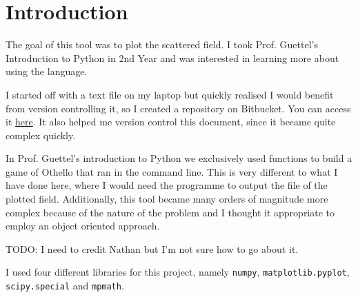 %
\section{Introduction}
%
The goal of this tool was to plot the scattered field. I took Prof. Guettel's Introduction to Python in 2nd Year and was interested in learning more about using the language. \par
%
I started off with a text file on my laptop but quickly realised I would benefit from version controlling it, so I created a repository on Bitbucket. You can access it \href{https://bitbucket.org/veracruz/canonical_scattering}{here}. It also helped me version control this document, since it became quite complex quickly. \par
%
In Prof. Guettel's introduction to Python we exclusively used functions to build a game of Othello that ran in the command line. This is very different to what I have done here, where I would need the programme to output the file of the plotted field. Additionally, this tool became many orders of magnitude more complex because of the nature of the problem and I thought it appropriate to employ an object oriented approach.\par
%
TODO: I need to credit Nathan but I'm not sure how to go about it.\par
%
I used four different libraries for this project, namely \verb!numpy!, \verb!matplotlib.pyplot!, \verb!scipy.special! and \verb!mpmath!.
%
